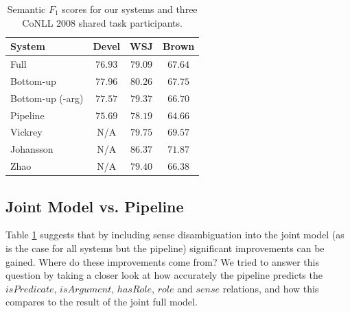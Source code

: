 
\begin{table}[ht]
    \centering
    \begin{tabular}{|p{3.0cm}|c|c|c|}\hline
        System                    & Devel      & WSJ       & Brown \\\hline 
        Full                      & $76.93$  & $79.09$ & $67.64$ \\
        Bottom-up                 & $77.96$  & $80.26$ & $67.75$ \\
        Bottom-up (-arg)          & $77.57$  & $79.37$ & $66.70$ \\
        Pipeline                  & $75.69$  & $78.19$ & $64.66$ \\
        \hline
        Vickrey                   &   N/A    & $79.75$ & $69.57$ \\
        Johansson                 &   N/A    & $86.37$ & $71.87$ \\
        Zhao                      &   N/A    & $79.40$ & $66.38$ \\
        \hline
    \end{tabular}
    \caption{Semantic $F_1$ scores for our systems and three CoNLL 2008 shared task participants.} 
    \label{tbl:results}
\end{table}



\subsection{Joint Model vs. Pipeline}
Table \ref{tbl:results} suggests that by including sense disambiguation into the joint model (as is the case for all systems but the pipeline) significant improvements can be gained. Where do these improvements come from? We tried to answer this question by taking a closer look at how accurately the pipeline predicts the $isPredicate$, $isArgument$, $hasRole$, $role$ and $sense$ relations, and how this compares to the result of the joint full model.

